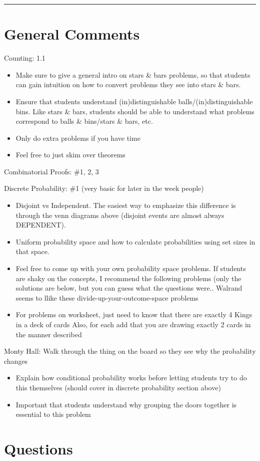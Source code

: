 \documentclass{exam}
\title{}
\date{Berlekamp-Welsh, Countability, Self Reference, Counting}
\begin{document}
\maketitle
\rule{\textwidth}{0.15em}
\fontsize{12}{15}\selectfont
\thispagestyle{empty}


\section{General Comments}
\begin{questions}
\item Counting: 1.1
\begin{itemize}
\item Make sure to give a general intro on stars \& bars problems, so that students can gain intuition on how to convert problems they see into stars \& bars. 
\item Ensure that students understand (in)distinguishable balls/(in)distinguishable bins. Like stars \& bars, students should be able to understand what problems correspond to balls \& bins/stars \& bars, etc.
\item Only do extra problems if you have time
\item Feel free to just skim over theorems
\end{itemize}
\item Combinatorial Proofs: \#1, 2, 3
\item Discrete Probability: \#1 (very basic for later in the week people)
\begin{itemize}
\item Disjoint vs Independent. The easiest way to emphasize this difference is through the venn diagrams above (disjoint events are almost always DEPENDENT).
\item Uniform probability space and how to calculate probabilities using set sizes in that space.
\item Feel free to come up with your own probability space problems. If students are shaky on the concepts, I recommend the following problems (only the solutions are below, but you can guess what the questions were.. Walrand seems to llike these divide-up-your-outcome-space problems
\item For problems on worksheet, just need to know that there are exactly 4 Kings in a deck of cards
Also, for each add that you are drawing exactly 2 cards in the manner described
\end{itemize}
\item Monty Hall: Walk through the thing on the board so they see why the probability changes
\begin{itemize}
\item Explain how conditional probability works before letting students try to do this themselves (should cover in discrete probability section above)
\item Important that students understand why grouping the doors together is essential to this problem
\end{itemize}
\end{questions}

\section{Questions}
\end{document}
